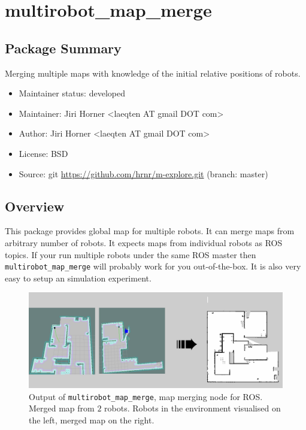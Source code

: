 \chapter{multirobot\_map\_merge}

\section{Package Summary}

Merging multiple maps with knowledge of the initial relative positions of robots.

\begin{itemize}
    \item Maintainer status: developed
    \item Maintainer: Jiri Horner \textless laeqten AT gmail DOT com\textgreater
    \item Author: Jiri Horner \textless laeqten AT gmail DOT com\textgreater
    \item License: BSD
    \item Source: git \url{https://github.com/hrnr/m-explore.git} (branch: master)
\end{itemize}

\section{Overview}

This package provides global map for multiple robots. It can merge maps from arbitrary number of robots. It expects maps from individual robots as ROS topics. If your run multiple robots under the same ROS master then \texttt{multirobot\_map\_merge} will probably work for you out-of-the-box. It is also very easy to setup an simulation experiment.

\begin{figure}
    \centering
    \includegraphics[width=4.53in]{../img/map_merge_cover.png}
    \caption{Output of \texttt{multirobot\_map\_merge}, map merging node for \gls{ROS}. Merged map from $2$ robots. Robots in the environment visualised on the left, merged map on the right.}
    \label{fig:mapmergecover}
\end{figure}

